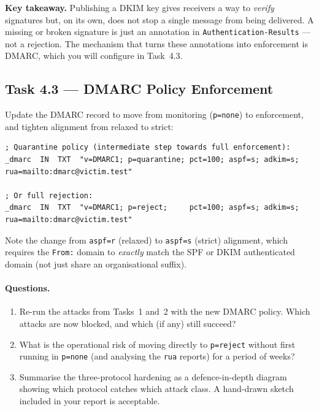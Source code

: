 \documentclass[11pt]{article}
\begin{document}
\begin{notebox}
\textbf{Key takeaway.} Publishing a DKIM key gives receivers a way to
\emph{verify} signatures but, on its own, does not stop a single
message from being delivered. A missing or broken signature is just an
annotation in \texttt{Authentication-Results} --- not a rejection. The
mechanism that turns these annotations into enforcement is DMARC,
which you will configure in Task~4.3.
\end{notebox}

\subsection{Task 4.3 --- DMARC Policy Enforcement}

Update the DMARC record to move from monitoring (\texttt{p=none}) to
enforcement, and tighten alignment from relaxed to strict:

\begin{listing}[H]
\begin{verbatim}
; Quarantine policy (intermediate step towards full enforcement):
_dmarc  IN  TXT  "v=DMARC1; p=quarantine; pct=100; aspf=s; adkim=s; rua=mailto:dmarc@victim.test"

; Or full rejection:
_dmarc  IN  TXT  "v=DMARC1; p=reject;     pct=100; aspf=s; adkim=s; rua=mailto:dmarc@victim.test"
\end{verbatim}
\end{listing}

Note the change from \texttt{aspf=r} (relaxed) to \texttt{aspf=s}
(strict) alignment, which requires the \texttt{From:} domain to
\emph{exactly} match the SPF or DKIM authenticated domain (not just
share an organisational suffix).

\paragraph{Questions.}
\begin{enumerate}[noitemsep]
  \item Re-run the attacks from Tasks~1 and~2 with the new DMARC
        policy. Which attacks are now blocked, and which (if any) still
        succeed?
  \item What is the operational risk of moving directly to
        \texttt{p=reject} without first running in \texttt{p=none}
        (and analysing the \texttt{rua} reports) for a period of weeks?
  \item Summarise the three-protocol hardening as a defence-in-depth
        diagram showing which protocol catches which attack class.
        A hand-drawn sketch included in your report is acceptable.
\end{enumerate}
\end{document}
